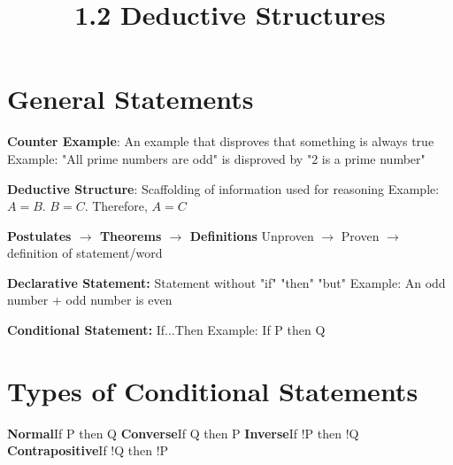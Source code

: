 \documentclass{article}
\begin{document}
	
	\setlength{\droptitle}{-5em}
	\title{1.2 Deductive Structures}
	\date{}
	\author{}
	\maketitle
	
	\section{General Statements}
	\indent \textbf{Counter Example}: An example that disproves that something is always true \newline
	\indent Example: "All prime numbers are odd" is disproved by "2 is a prime number" \newline \newline
	
	\noindent \textbf{Deductive Structure}: Scaffolding of information used for reasoning \newline
	\indent Example: $A = B$. $B = C$. Therefore, $A = C$
	\newline \newline
	
	\noindent \textbf{Postulates $\rightarrow$ Theorems $\rightarrow$ Definitions} \newline
	\indent Unproven $\rightarrow$ Proven $\rightarrow$ definition of statement/word
	\newline \newline
	
	\noindent \textbf{Declarative Statement:} Statement without "if" "then" "but"
	\newline
	\indent Example: An odd number + odd number is even
	\newline \newline
	
	\noindent \textbf{Conditional Statement:} If...Then
	\newline
	\indent Example: If P then Q
	
	\section{Types of Conditional Statements}
	
	\textbf{Normal}\newline \indent If P then Q \newline
	\textbf{Converse}\newline \indent If Q then P \newline
	\textbf{Inverse}\newline \indent If !P then !Q \newline
	\textbf{Contrapositive}\newline \indent If !Q then !P \newline
\end{document}
